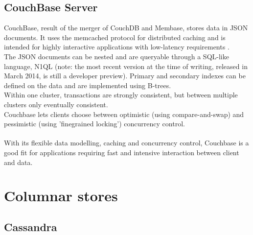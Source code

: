 \documentclass{IEEEtran}
\begin{document}
\subsection{CouchBase Server}

CouchBase, result of the merger of CouchDB and Membase, stores data in JSON documents. It uses the memcached protocol for distributed caching and is intended for highly interactive applications with low-latency requirements \cite{grolinger2013data}\cite{couchbase_about}.
\\The JSON documents can be nested and are queryable through a SQL-like language, N1QL (note: the most recent version at the time of writing, released in March 2014, is still a developer preview)\cite{couchbase_n1ql}. Primary and secondary indexes can be defined on the data and are implemented using B-trees\cite{couchbase_index}.
\\Within one cluster, transactions are strongly consistent, but between multiple clusters only eventually consistent.
\\Couchbase lets clients choose between optimistic (using compare-and-swap) and pessimistic (using 'finegrained locking') concurrency control.
\\\\With its flexible data modelling, caching and concurrency control, Couchbase is a good fit for applications requiring fast and intensive interaction between client and data.


\section{Columnar stores}
\subsection{Cassandra}
\end{document}
